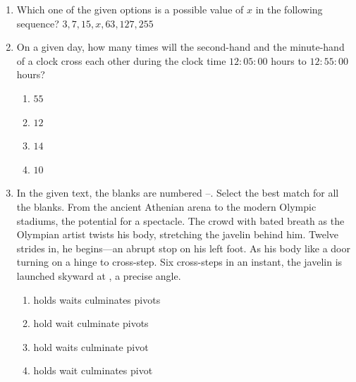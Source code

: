\documentclass[journal,12pt,onecolumn]{IEEEtran}
\theoremstyle{remark}
\begin{document}
\begin{enumerate}
		\hfill{}
		
		\item Which one of the given options is a possible value of $x$ in the following sequence?
		$3, 7, 15, x, 63, 127, 255$
		
		\hfill{}
		\begin{enumerate}
		\end{enumerate}
		
		\item On a given day, how many times will the second-hand and the minute-hand of a clock cross each other during the clock time $12 \colon 05 \colon 00$ hours to $12 \colon 55 \colon 00$ hours?
		
		\hfill{\brak{\text{GATE GA 2024}}}
		\begin{enumerate}
			\item $55$
			\item $12$
			\item $14$
			\item $10$
		\end{enumerate}
		
		\item In the given text, the blanks are numbered --. Select the best match for all the blanks.
		From the ancient Athenian arena to the modern Olympic stadiums,  the potential for a spectacle. The crowd  with bated breath as the Olympian artist twists his body, stretching the javelin behind him. Twelve strides in, he begins---an abrupt stop on his left foot. As his body  like a door turning on a hinge to cross-step. Six cross-steps in an instant, the javelin is launched skyward at , a precise angle.
		
		\hfill{}
		\begin{enumerate}
			\item {} holds  waits  culminates  pivots
			\item {} hold  wait  culminate  pivots
			\item {} hold  waits  culminate  pivot
			\item {} holds  wait  culminates  pivot
		\end{enumerate}
		

\end{enumerate}
\end{document}
